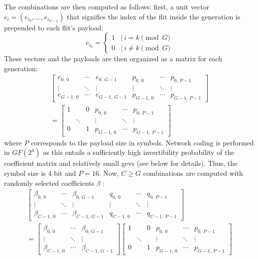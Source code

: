 The combinations are then computed as follows: first, a unit vector $e_i = (e_{i_0}, …, e_{i_{G-1}})$ that signifies the index of the flit inside the
generation \cite[cf.][3]{chou03practicalnc} is prepended to each flit's payload:
\[
    e_{i_k} =
    \begin{cases}
        1 & |\ i = k \pmod G \\
        0 & |\ i \neq k \pmod G
    \end{cases}
\]
These vectors and the payloads are then organized as a matrix for each generation:
\[
    \begin{split}
        \begin{bmatrix}
            e_{0,\,0} & \cdots & e_{0,\,G-1} & p_{0,\,0} & \cdots & p_{0,\,P-1} \\
            \vdots & \ddots & \vdots & \vdots & \ddots & \vdots \\
            e_{G-1,\,0} & \cdots & e_{G-1,\,G-1} & p_{G-1,\,0} & \cdots & p_{G-1,\,P-1}
        \end{bmatrix}\\
        =
        \begin{bmatrix}
            1 & & 0 & p_{0,\,0} & \cdots & p_{0,\,P-1} \\
            & \ddots & & \vdots & \ddots & \vdots \\
            0 & & 1 & p_{G-1,\,0} & \cdots & p_{G-1,\,P-1}
        \end{bmatrix}
    \end{split}
\]
where $P$ corresponds to the payload size in symbols. Network coding is performed in $GF(2^4)$ as this entails a sufficiently high invertibility
probability of the coefficient matrix and relatively small \glspl{gev} (see below for details). Thus, the symbol size is 4 bit and $P = 16$. Now,
$C \geq G$ combinations are computed with randomly selected coefficients $\beta$ \cite[cf.][]{ho03randomcoding}:
\[
    \begin{split}
        \begin{bmatrix}
            \beta_{0,\,0} & \cdots & \beta_{0,\,G-1} & q_{0,\,0} & \cdots & q_{0,\,P-1} \\
            \vdots & \ddots & \vdots & \vdots & \ddots & \vdots \\
            \beta_{C-1,\,0} & \cdots & \beta_{C-1,\,G-1} & q_{C-1,\,0} & \cdots & q_{C-1,\,P-1}
        \end{bmatrix}\\
        =
        \begin{bmatrix}
            \beta_{0,\,0} & \cdots & \beta_{0,\,G-1}\\
            \vdots & \ddots & \vdots \\
            \beta_{C-1,\,0} & \cdots & \beta_{C-1,\,G-1}
        \end{bmatrix}
        \begin{bmatrix}
            1 & & 0 & p_{0,\,0} & \cdots & p_{0,\,P-1} \\
            & \ddots & & \vdots & \ddots & \vdots \\
            0 & & 1 & p_{G-1,\,0} & \cdots & p_{G-1,\,P-1}
        \end{bmatrix}
    \end{split}
\]
